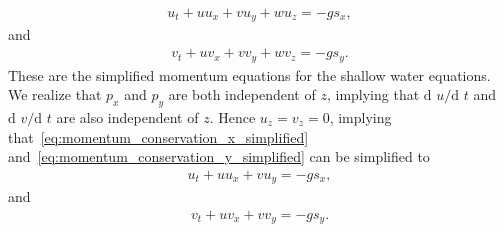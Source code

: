\begin{align}\label{eq:momentum_conservation_x_simplified}
    u_t + u u_x + v u_y + w u_z = -g s_x, 
\end{align}
and
\begin{align}\label{eq:momentum_conservation_y_simplified}
    v_t + u v_x + v v_y + w v_z = -g s_y.
\end{align}
These are the simplified momentum equations for the shallow water equations.
We realize that $p_x$ and $p_y$ are both independent of $z$, implying that $\text{d }u/ \text{d }t$ and $\text{d }v/ \text{d }t$ are also independent of $z$.
Hence $u_z = v_z = 0$, implying that~\eqref{eq:momentum_conservation_x_simplified} and~\eqref{eq:momentum_conservation_y_simplified} can be simplified to
\begin{align}\label{eq:momentum_conservation_x_final}
    u_t + u u_x + v u_y = -g s_x, 
\end{align}
and
\begin{align}\label{eq:momentum_conservation_y_final}
    v_t + u v_x + v v_y = -g s_y.
\end{align}



